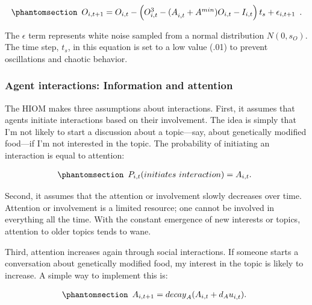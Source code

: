 \documentclass[
  a4paper,
  DIV=11,
  numbers=noendperiod,
  oneside]{scrreprt}
\begin{document}
\begin{equation}\phantomsection\label{eq-ch7-3-old-52}{\begin{array}{r}
O_{i,t+1}=O_{i,t}-\left(O_{i,t}^3-{(A}_{i,t}+A^{min})O_{i,t}-I_{i,t}\right)t_s+\epsilon_{i,t+1}
\end{array}.}\end{equation}

The \(\epsilon\) term represents white noise sampled from a normal
distribution \(N(0, s_{O})\). The time step, \(t_{s}\), in this equation
is set to a low value (.01) to prevent oscillations and chaotic
behavior.

\subsubsection{Agent interactions: Information and
attention}\label{sec-Agent-interactions-information-and-attention}

The HIOM makes three assumptions about interactions. First, it assumes
that agents initiate interactions based on their involvement. The idea
is simply that I'm not likely to start a discussion about a topic---say,
about genetically modified food---if I'm not interested in the topic.
The probability of initiating an interaction is equal to attention:

\begin{equation}\phantomsection\label{eq-ch7-4-old-53}{\begin{array}{r}
P_{i,t}(initiates\ interaction) = A_{i,t}.
\end{array}}\end{equation}

Second, it assumes that the attention or involvement slowly decreases
over time. Attention or involvement is a limited resource; one cannot be
involved in everything all the time. With the constant emergence of new
interests or topics, attention to older topics tends to wane.

Third, attention increases again through social interactions. If someone
starts a conversation about genetically modified food, my interest in
the topic is likely to increase. A simple way to implement this is:

\begin{equation}\phantomsection\label{eq-ch7-5-old-54}{\begin{array}{r}
A_{i,t+1}={decay}_A(A_{i,t}+{d_Au}_{i,t}).
\end{array}}\end{equation}
\end{document}
